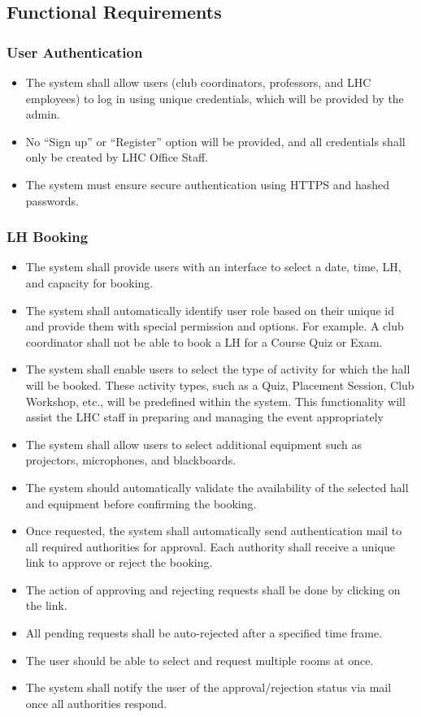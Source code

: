 \documentclass[a4paper,12pt]{article}
\begin{document}
\subsection{Functional Requirements} \label{subsec:functional}

\subsubsection{User Authentication}
\begin{itemize} 
    \item The system shall allow users (club coordinators, professors, and LHC employees) to log in using unique credentials, which will be provided by the admin.
    \item No “Sign up” or “Register” option will be provided, and all credentials shall only be created by LHC Office Staff.
    \item The system must ensure secure authentication using HTTPS and hashed passwords.
\end{itemize}

\subsubsection{LH Booking}
\begin{itemize} 
    \item The system shall provide users with an interface to select a date, time, LH, and capacity for booking.
    \item The system shall automatically identify user role based on their unique id and provide them with special permission and options. For example. A club coordinator shall not be able to book a LH for a Course Quiz or Exam.
    \item The system shall enable users to select the type of activity for which the hall will be booked. These activity types, such as a Quiz, Placement Session, Club Workshop, etc., will be predefined within the system. This functionality will assist the LHC staff in preparing and managing the event appropriately
    \item The system shall allow users to select additional equipment such as projectors, microphones, and blackboards.
    \item The system should automatically validate the availability of the selected hall and equipment before confirming the booking.
    \item Once requested, the system shall automatically send authentication mail to all required authorities for approval. Each authority shall receive a unique link to approve or reject the booking.
    \item The action of approving and rejecting requests shall be done by clicking on the link.
    \item All pending requests shall be auto-rejected after a specified time frame.
    \item The user should be able to select and request multiple rooms at once.
    \item The system shall notify the user of the approval/rejection status via mail once all authorities respond.
\end{itemize}
\end{document}
